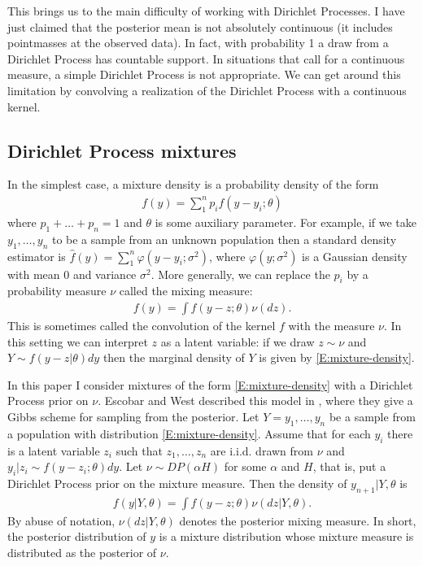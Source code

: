 \documentclass[letterpaper,11pt]{article}
\begin{document}
This brings us to the main difficulty of working with Dirichlet Processes. I have just claimed that the posterior mean is not absolutely continuous (it includes pointmasses at the observed data). In fact, with probability 1 a draw from a Dirichlet Process has countable support. In situations that call for a continuous measure, a simple Dirichlet Process is not appropriate. We can get around this limitation by convolving a realization of the Dirichlet Process with a continuous kernel.

\subsection{Dirichlet Process mixtures}

In the simplest case, a mixture density is a probability density of the form 
\begin{align}\label{E:mixture-simple}
    f(y) = \sum_1^n p_i f(y - y_i; \theta)
\end{align}
where $p_1 + \dots + p_n = 1$ and $\theta$ is some auxiliary parameter. For example, if we take $y_1, \dots, y_n$ to be a sample from an unknown population then a standard density estimator is $\hat{f}(y) = \sum_1^n \varphi(y - y_i; \sigma^2)$, where $\varphi(y; \sigma^2)$ is a Gaussian density with mean 0 and variance $\sigma^2$. More generally, we can replace the $p_i$ by a probability measure $\nu$ called the mixing measure:
\begin{align}
    f(y) = \int f(y - z;\theta) \nu(dz).
    \label{E:mixture-density}
\end{align}
This is sometimes called the convolution of the kernel $f$ with the measure $\nu$. In this setting we can interpret $z$ as a latent variable: if we draw $z \sim \nu$ and $Y \sim f(y - z|\theta)dy$ then the marginal density of $Y$ is given by \eqref{E:mixture-density}.

In this paper I consider mixtures of the form \eqref{E:mixture-density} with a Dirichlet Process prior on $\nu$. Escobar and West described this model in \cite{ew95}, where they give a Gibbs scheme for sampling from the posterior. Let $Y = y_1, \dots, y_n$ be a sample from a population with distribution \eqref{E:mixture-density}. Assume that for each $y_i$ there is a latent variable $z_i$ such that $z_1, \dots, z_n$ are i.i.d. drawn from $\nu$ and $y_i|z_i \sim f(y - z_i; \theta)dy $. Let $\nu \sim DP(\alpha H)$ for some $\alpha$ and $H$, that is, put a Dirichlet Process prior on the mixture measure. Then the density of $y_{n+1} | Y, \theta$ is
\begin{align*}
    f(y|Y, \theta) = \int f(y - z; \theta) \nu(dz | Y, \theta).
\end{align*}
By abuse of notation, $\nu(dz|Y, \theta)$ denotes the posterior mixing measure. In short, the posterior distribution of $y$ is a mixture distribution whose mixture measure is distributed as the posterior of $\nu$.
\end{document}
